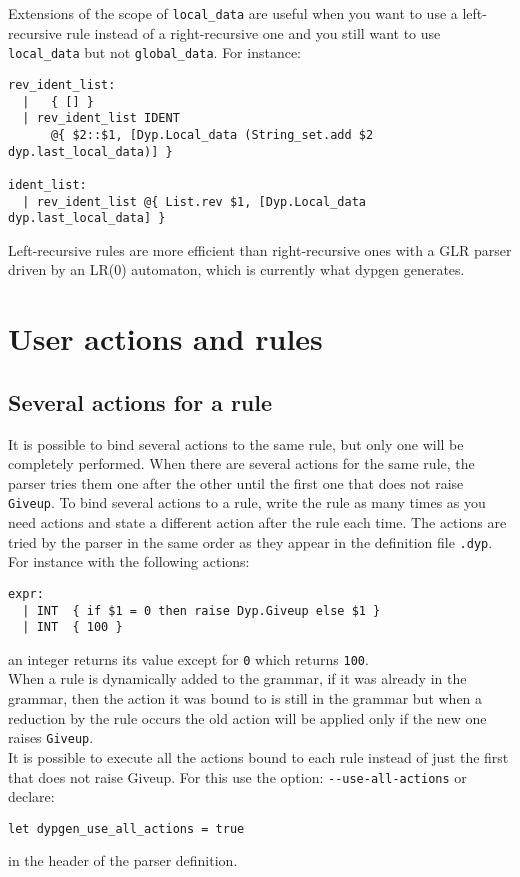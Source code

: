 \documentclass[12pt]{article}
\begin{document}
{Extensions of the scope of \verb|local_data| are useful when you want to use a left-recursive rule instead of a right-recursive one and you still want to use \verb|local_data| but not \verb|global_data|. For instance:

\begin{verbatim}
rev_ident_list:
  |   { [] }
  | rev_ident_list IDENT
      @{ $2::$1, [Dyp.Local_data (String_set.add $2 dyp.last_local_data)] }

ident_list:
  | rev_ident_list @{ List.rev $1, [Dyp.Local_data dyp.last_local_data] }
\end{verbatim}

Left-recursive rules are more efficient than right-recursive ones with a GLR parser driven by an LR(0) automaton, which is currently what dypgen generates.

\section{User actions and rules}

\subsection{Several actions for a rule}

It is possible to bind several actions to the same rule, but only one will be completely performed. When there are several actions for the same rule, the parser tries them one after the other until the first one that does not raise \texttt{Giveup}. To bind several actions to a rule, write the rule as many times as you need actions and state a different action after the rule each time. The actions are tried by the parser in the same order as they appear in the definition file \texttt{.dyp}. For instance with the following actions:
\begin{verbatim}
expr:
  | INT  { if $1 = 0 then raise Dyp.Giveup else $1 }
  | INT  { 100 }
\end{verbatim}
an integer returns its value except for \texttt{0} which returns \texttt{100}.\\

When a rule is dynamically added to the grammar, if it was already in the grammar, then the action it was bound to is still in the grammar but when a reduction by the rule occurs the old action will be applied only if the new one raises \texttt{Giveup}.\\

It is possible to execute all the actions bound to each rule instead
of just the first that does not raise Giveup. For this use the option:
\verb|--use-all-actions| or declare:
\begin{verbatim}
let dypgen_use_all_actions = true
\end{verbatim}
in the header of the parser definition.

}
\end{document}
